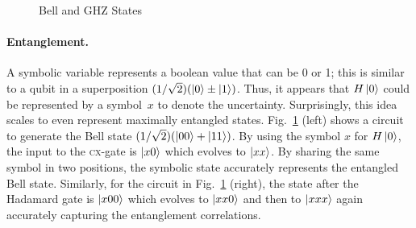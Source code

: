 \documentclass[aps,prl,twocolumn,superscriptaddress,floatfix,notitlepage]{revtex4-2}
\newcommand{\cx}{\textsc{cx}}
\begin{document}
\begin{figure}[t]
\begin{center}
\qquad\qquad
{}
\end{center}
\caption{\label{fig:bell2}Bell and GHZ States}
\end{figure}
\paragraph*{Entanglement.}
A symbolic variable represents a boolean value that can be 0 or 1;
this is similar to a qubit in a superposition $(1/\sqrt{2}) (\ket{0}
\pm \ket{1})$. Thus, it appears that $H\ket{0}$ could be represented
by a symbol~$x$ to denote the uncertainty. Surprisingly, this idea
scales to even represent maximally entangled
states. Fig.~\ref{fig:bell2} (left) shows a circuit to generate the Bell
state $(1/\sqrt{2}) (\ket{00} + \ket{11})$. By using the symbol $x$
for $H\ket{0}$, the input to the \cx-gate is $\ket{x0}$ which
evolves to $\ket{xx}$. By sharing the same symbol in two positions,
the symbolic state accurately represents the entangled Bell
state. Similarly, for the circuit in Fig.~\ref{fig:bell2} (right), the
state after the Hadamard gate is $\ket{x00}$ which evolves to
$\ket{xx0}$ and then to $\ket{xxx}$ again accurately capturing the
entanglement correlations.
\end{document}
